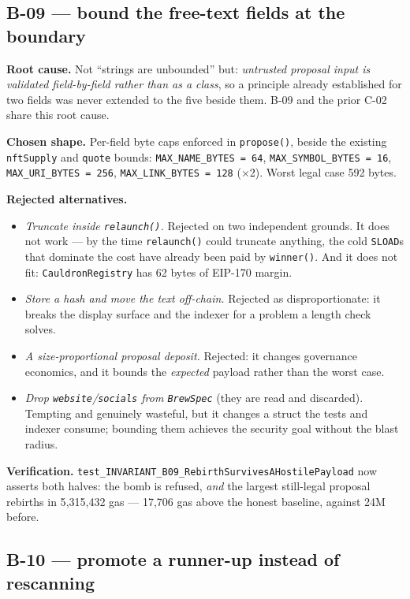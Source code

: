 \documentclass[11pt,a4paper]{article}
\newcommand{\code}[1]{\texttt{\small #1}}
\begin{document}
\subsection{B-09 --- bound the free-text fields at the boundary}

\textbf{Root cause.} Not ``strings are unbounded'' but: \emph{untrusted proposal input is
validated field-by-field rather than as a class}, so a principle already established for
two fields was never extended to the five beside them. B-09 and the prior C-02 share this
root cause.

\textbf{Chosen shape.} Per-field byte caps enforced in \code{propose()}, beside the
existing \code{nftSupply} and \code{quote} bounds:
\code{MAX\_NAME\_BYTES = 64}, \code{MAX\_SYMBOL\_BYTES = 16},
\code{MAX\_URI\_BYTES = 256}, \code{MAX\_LINK\_BYTES = 128} ($\times$2).
Worst legal case 592 bytes.

\textbf{Rejected alternatives.}
\begin{itemize}
\item \emph{Truncate inside \code{relaunch()}.} Rejected on two independent grounds. It
      does not work --- by the time \code{relaunch()} could truncate anything, the cold
      \code{SLOAD}s that dominate the cost have already been paid by \code{winner()}. And
      it does not fit: \code{CauldronRegistry} has 62 bytes of EIP-170 margin.
\item \emph{Store a hash and move the text off-chain.} Rejected as disproportionate: it
      breaks the display surface and the indexer for a problem a length check solves.
\item \emph{A size-proportional proposal deposit.} Rejected: it changes governance
      economics, and it bounds the \emph{expected} payload rather than the worst case.
\item \emph{Drop \code{website}/\code{socials} from \code{BrewSpec}} (they are read and
      discarded). Tempting and genuinely wasteful, but it changes a struct the tests and
      indexer consume; bounding them achieves the security goal without the blast radius.
\end{itemize}

\textbf{Verification.} \code{test\_INVARIANT\_B09\_RebirthSurvivesAHostilePayload} now
asserts both halves: the bomb is refused, \emph{and} the largest still-legal proposal
rebirths in 5{,}315{,}432 gas --- 17{,}706 gas above the honest baseline, against 24M
before.

\subsection{B-10 --- promote a runner-up instead of rescanning}
\end{document}
